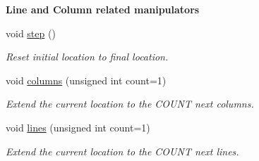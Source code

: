 \begin{Indent}{\bf Line and Column related manipulators}\par
\begin{DoxyCompactItemize}
\item 
\hypertarget{classyy_1_1location_a96620cec8dd8ebfc96c60a03c10154d0}{void \hyperlink{classyy_1_1location_a96620cec8dd8ebfc96c60a03c10154d0}{step} ()}\label{classyy_1_1location_a96620cec8dd8ebfc96c60a03c10154d0}

\begin{DoxyCompactList}\small\item\em Reset initial location to final location. \end{DoxyCompactList}\item 
\hypertarget{classyy_1_1location_a044d2ef2831243279beb5e1b93ffca39}{void \hyperlink{classyy_1_1location_a044d2ef2831243279beb5e1b93ffca39}{columns} (unsigned int count=1)}\label{classyy_1_1location_a044d2ef2831243279beb5e1b93ffca39}

\begin{DoxyCompactList}\small\item\em Extend the current location to the C\-O\-U\-N\-T next columns. \end{DoxyCompactList}\item 
\hypertarget{classyy_1_1location_af05c5d78c5a53fb3aa4ef4e34c9eb723}{void \hyperlink{classyy_1_1location_af05c5d78c5a53fb3aa4ef4e34c9eb723}{lines} (unsigned int count=1)}\label{classyy_1_1location_af05c5d78c5a53fb3aa4ef4e34c9eb723}

\begin{DoxyCompactList}\small\item\em Extend the current location to the C\-O\-U\-N\-T next lines. \end{DoxyCompactList}\end{DoxyCompactItemize}
\end{Indent}
